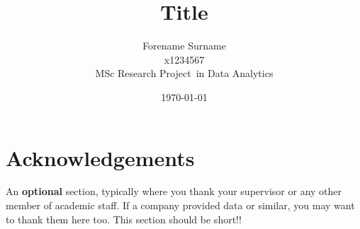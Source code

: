 \documentclass[12pt,a4paper]{article}
\newcommand{\mytype}{MSc Research Project}
\newcommand{\mystream}{Data Analytics}
\newcommand{\myname}{Forename Surname}
\newcommand{\SID}{x1234567}
\newcommand{\mytitle}{Title}
\begin{document}




\title{\mytitle}%
\author{\myname \\ \SID \\ \mytype\ in \mystream}%
\date{\today}
\maketitle









\section*{Acknowledgements}
An {\bf optional} section, typically where you thank your supervisor or any other member of academic staff. If a company provided data or similar, you may want to thank them here too. This section should be short!!




												  







\end{document}
